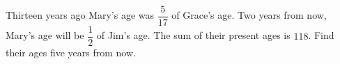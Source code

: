 Thirteen years ago Mary's age was $\dfrac{5}{17}$ of Grace's age. Two years from now, Mary's age will be $\dfrac{1}{2}$ of Jim's age. The sum of their present ages is $118$. Find their ages five years from now.
